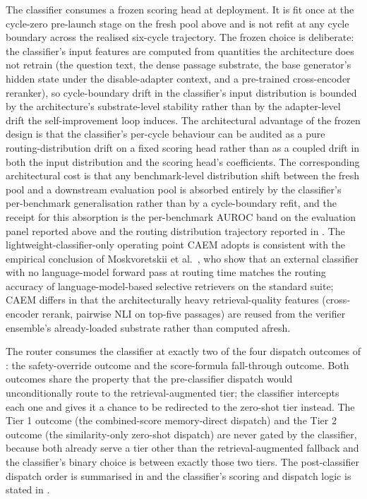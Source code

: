 The classifier consumes a frozen scoring head at deployment. It is fit once at the cycle-zero pre-launch stage on the fresh pool above and is not refit at any cycle boundary across the realised six-cycle trajectory. The frozen choice is deliberate: the classifier's input features are computed from quantities the architecture does not retrain (the question text, the dense passage substrate, the base generator's hidden state under the disable-adapter context, and a pre-trained cross-encoder reranker), so cycle-boundary drift in the classifier's input distribution is bounded by the architecture's substrate-level stability rather than by the adapter-level drift the self-improvement loop induces. The architectural advantage of the frozen design is that the classifier's per-cycle behaviour can be audited as a pure routing-distribution drift on a fixed scoring head rather than as a coupled drift in both the input distribution and the scoring head's coefficients. The corresponding architectural cost is that any benchmark-level distribution shift between the fresh pool and a downstream evaluation pool is absorbed entirely by the classifier's per-benchmark generalisation rather than by a cycle-boundary refit, and the receipt for this absorption is the per-benchmark AUROC band on the evaluation panel reported above and the routing distribution trajectory reported in . The lightweight-classifier-only operating point CAEM adopts is consistent with the empirical conclusion of Moskvoretskii et al.~\cite{moskvoretskii2025llm}, who show that an external classifier with no language-model forward pass at routing time matches the routing accuracy of language-model-based selective retrievers on the standard suite; CAEM differs in that the architecturally heavy retrieval-quality features (cross-encoder rerank, pairwise NLI on top-five passages) are reused from the verifier ensemble's already-loaded substrate rather than computed afresh.

The router consumes the classifier at exactly two of the four dispatch outcomes of : the safety-override outcome and the score-formula fall-through outcome. Both outcomes share the property that the pre-classifier dispatch would unconditionally route to the retrieval-augmented tier; the classifier intercepts each one and gives it a chance to be redirected to the zero-shot tier instead. The Tier 1 outcome (the combined-score memory-direct dispatch) and the Tier 2 outcome (the similarity-only zero-shot dispatch) are never gated by the classifier, because both already serve a tier other than the retrieval-augmented fallback and the classifier's binary choice is between exactly those two tiers. The post-classifier dispatch order is summarised in  and the classifier's scoring and dispatch logic is stated in .

